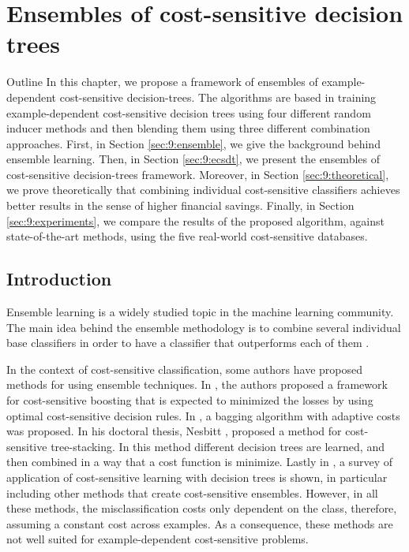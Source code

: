 \chapter{Ensembles of cost-sensitive decision trees}\label{ch:9}

\begin{remark}{Outline}
In this chapter, we propose a framework of ensembles of example-dependent cost-sensitive 
decision-trees. The algorithms are based in training example-dependent cost-sensitive decision 
trees using four different random inducer methods and then blending them using three different 
combination approaches.
First, in Section \ref{sec:9:ensemble}, we give the background behind ensemble learning. Then, in 
Section \ref{sec:9:ecsdt}, we present the ensembles of cost-sensitive decision-trees framework. 
Moreover, in Section \ref{sec:9:theoretical}, we prove theoretically that combining individual 
cost-sensitive classifiers achieves better  results in the sense of higher financial savings. 
Finally, in Section \ref{sec:9:experiments}, we compare the results of the proposed algorithm, 
against state-of-the-art methods, using the five real-world cost-sensitive databases.
\end{remark}

\section{Introduction}
\label{sec:9:intro}

Ensemble learning is a widely studied topic in the machine learning community. The main idea behind 
the ensemble methodology is to combine several individual base classifiers in   order to have a 
classifier that outperforms each of them \citep{Rokach2009}.

In the context of cost-sensitive classification, some authors have proposed methods for using 
ensemble techniques. In \citep{Masnadi-shirazi2011}, the authors proposed a framework for 
cost-sensitive boosting that is expected to minimized the losses by using optimal cost-sensitive 
decision rules. In \citep{Street2008}, a bagging algorithm with adaptive costs was proposed. In 
his doctoral thesis, Nesbitt \citep{Nesbitt2010}, proposed a method for cost-sensitive 
tree-stacking. In this method different decision trees are learned, and then combined in a way 
that a cost function is minimize. Lastly in \citep{Lomax2013}, a survey of application of 
cost-sensitive learning with decision trees is shown, in particular including other methods that 
create cost-sensitive ensembles. However, in all these methods, the  misclassification costs only 
dependent on the class, therefore, assuming a constant cost across  examples. As a consequence, 
these methods are not  well suited for example-dependent cost-sensitive  problems. 

